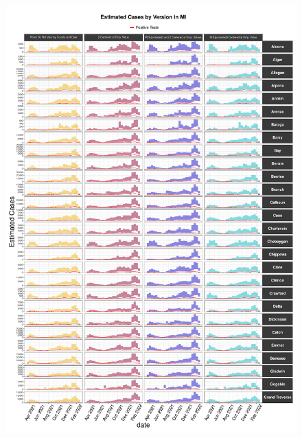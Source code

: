 \documentclass[12pt,twoside]{smiththesis}
\begin{document}
\begin{figure}
\includegraphics[width=1\linewidth]{figure/mi1_pb_compared_to_observed} \caption{\label{fig:pb_versions_mi}}\label{fig:unnamed-chunk-74-1}
\end{figure}
\end{document}
